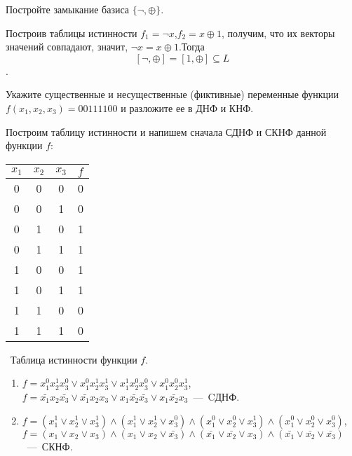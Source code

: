 \begin{exercise}
Постройте замыкание базиса $\{\neg,\oplus\}$.
\end{exercise}

\begin{solution}
Построив таблицы истинности $f_1=\neg x$,$f_2=x\oplus 1$, получим, что их векторы значений совпадают, значит, $\neg x=x\oplus 1$.Тогда
$$[{\neg , \oplus}]=[{1,\oplus}]\subseteq L$$.
\end{solution}

\begin{exercise}
Укажите существенные и несущественные (фиктивные) переменные функции 
	$f(x_1,x_2,x_3)=00111100$ и разложите ее в ДНФ и КНФ.
\end{exercise}

\begin{solution} Построим таблицу истинности и напишем сначала СДНФ и СКНФ данной функции $f$:

\begin{center}
 \begin{tabular}{| c c c | c |}
  \hline	
 $x_1$ & $x_2$ & $x_3$ & $f$ \T\B \\
  \hline\hline
  0 & 0 & 0 & 0 \T\B \\ 
  0 & 0 & 1 & 0 \B \\
  0 & 1 & 0 & 1 \B \\
  0 & 1 & 1 & 1 \B \\
  1 & 0 & 0 & 1 \B \\
  1 & 0 & 1 & 1 \B \\
  1 & 1 & 0 & 0 \B \\
  1 & 1 & 1 & 0 \B \\
  \hline
 \end{tabular}
 \vspace{0,4 cm}
 
 \
 \small Таблица истинности функции $f$.
\end{center}
\begin{enumerate}
\item$f=x_1^0x_2^1x_3^0\vee x_1^0x_2^1x_3^1\vee x_1^1x_2^0x_3^0\vee x_1^0x_2^0x_3^1$,\\
$f=\bar{x_1}x_2\bar{x_3}\vee \bar{x_1}x_2x_3\vee x_1\bar{x_2}\bar{x_3}\vee x_1\bar{x_2}x_3$~---~CДНФ.
\item$f=(x_1^1\vee x_2^1\vee x_3^1)\wedge(x_1^1\vee x_2^1\vee x_3^0)\wedge(x_1^0\vee x_2^0\vee x_3^1)\wedge(x_1^0\vee x_2^0\vee x_3^0)$,\\
$f=(x_1\vee x_2\vee x_3)\wedge(x_1\vee x_2\vee \bar{x_3})\wedge(\bar{x_1}\vee \bar{x_2}\vee x_3)\wedge(\bar{x_1}\vee \bar{x_2}\vee \bar{x_3})$~---~СКНФ.\\


\end{enumerate}
\end{solution}
